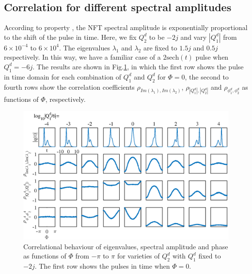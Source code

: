 \documentclass[9pt,twocolumn,twoside]{osajnl}
\begin{document}
\subsection{Correlation for different spectral amplitudes}
According to property , the NFT spectral amplitude is exponentially proportional to the shift of the pulse in time. Here, we fix $Q^d_2$ to be $-2j$ and vary $|Q^d_1|$ from $6\times10^{-4}$ to $6\times10^4$. The eigenvalues $\lambda_1$ and $\lambda_2$ are fixed to $1.5j$ and $0.5j$ respectively. In this way, we have a familiar case of a $2\text{sech}(t)$ pulse when $Q^d_1=-6j$. The results are shown in Fig.\ref{fig:fig2}, in which the first row shows the pulse in time domain for each combination of $Q^d_1$ and $Q^d_2$ for $\Phi=0$, the second to fourth rows show the correlation coefficients $\rho_{Im(\lambda_1),Im(\lambda_2)}$, $\rho_{|Q^d_1|,|Q^d_2|}$ and $\rho_{\phi^d_1,\phi^d_2}$ as functions of $\Phi$, respectively.
\begin{figure}[htbp]
    \centering
    \includegraphics[width=\linewidth]{QCorrelation}
    \caption{Correlational behaviour of eigenvalues, spectral amplitude and phase as functions of $\Phi$ from $-\pi$ to $\pi$ for varieties of $Q^d_2$ with $Q^d_1$ fixed to $-2j$. The first row shows the pulses in time when $\Phi=0$.}
    \label{fig:fig2}
\end{figure}
\end{document}
